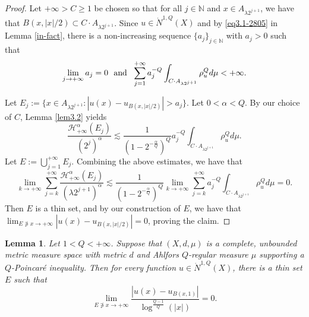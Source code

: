 \documentclass[10pt]{amsart}
\newtheorem{lemma}[theorem]{Lemma}
\numberwithin{equation}{section}
\newcommand{\N}{\mathbb{N}}
\begin{document}
 \begin{proof}
 Let $+\infty>C\ge 1$ be chosen so that for all $j\in\N$ and $x\in A_{\lambda 2^{j+1}}$, we have that $B(x,|x|/2)\subset C\cdot A_{\lambda 2^{j+1}}$.  Since $u\in \dot N^{1,Q}(X)$ and by \eqref{eq3.1-2805} in Lemma \ref{in-fact}, there is a non-increasing sequence $\{a_j\}_{j\in\mathbb N}$ with $a_j>0$ such that
 	\[
		\lim_{j\to{+\infty}}a_j=0\text{\rm \ \ and\ \ }  \sum_{j=1}^{+\infty} a_{j}^{-Q}\int_{C\cdot A_{\lambda 2^{j+1}}}\rho_u^Qd\mu<{+\infty}.
	\]
	 
	Let $E_j:=\{x\in A_{\lambda 2^{j+1}}:|u(x)-u_{B(x,|x|/2)}|>a_j\}$. Let $0<\alpha<Q$. By our choice of $C$, Lemma \ref{lem3.2} yields
	\[
		\frac{\mathcal H^\alpha_{+\infty}(E_j)}{(2^j)^\alpha }\lesssim \frac{1}{(1-2^{-\frac{\alpha}{Q}})^Q} a_j^{-Q}\int_{C\cdot A_{\lambda 2^{j+1}}}\rho_u^Qd\mu.
	\]
	  Let $E:=\bigcup_{j=1}^{+\infty} E_j$. Combining the above estimates, we have that
	\[
	 \lim_{k\to{+\infty}}\sum_{j=k}^{+\infty}
	 \frac{\mathcal H^\alpha_{+\infty}(E_j)}{(\lambda 2^{j+1})^\alpha }\lesssim \frac{1}{(1-2^{-\frac{\alpha}{Q}})^Q} \lim_{k\to+\infty}\sum_{j=k}^{+\infty}a_j^{-Q}\int_{C\cdot A_{\lambda 2^{j+1}}}\rho_u^Qd\mu=0.
	\] Then $E$ is a thin set, and by our construction of $E$, we have that  $\lim_{E\not\ni x\to{+\infty}}|u(x)-u_{B(x,|x|/2)}|=0$, proving the claim.
 \end{proof}
 \begin{lemma}\label{thm3.3-2605}
Let  $1<Q<+\infty$. 
Suppose that $(X,d,\mu)$ is a complete, unbounded metric measure space with metric $d$ and Ahlfors $Q$-regular measure $\mu$ supporting a $Q$-Poincar\'e inequality.
Then for every function $u\in\dot N^{1,Q}(X)$, there is a thin set $E$ such that
 \begin{equation}\label{eq3.2-2805}
 \lim_{E\not\ni x\to{+\infty}}\frac{|u(x)-u_{B(x,1)}|}{\log^{\frac{Q-1}{Q}}(|x|)}=0.
 \end{equation}
 \end{lemma}
\end{document}
